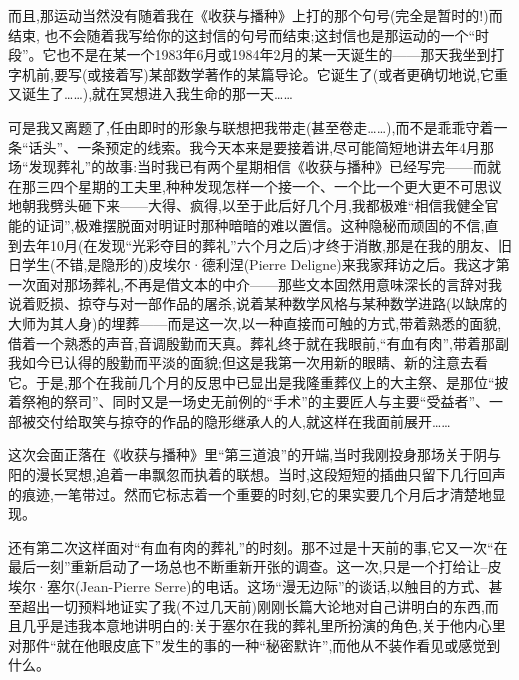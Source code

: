 而且,那运动当然没有随着我在《收获与播种》上打的那个句号(完全是暂时的!)而结束,
也不会随着我写给你的这封信的句号而结束;这封信也是那运动的一个“时段”。它也不是在某一个1983年6月或1984年2月的某一天诞生的——那天我坐到打字机前,要写(或接着写)某部数学著作的某篇导论。它诞生了(或者更确切地说,它重又诞生了……),就在冥想进入我生命的那一天……

可是我又离题了,任由即时的形象与联想把我带走(甚至卷走……),而不是乖乖守着一条“话头”、一条预定的线索。我今天本来是要接着讲,尽可能简短地讲去年4月那场“发现葬礼”的故事:当时我已有两个星期相信《收获与播种》已经写完——而就在那三四个星期的工夫里,种种发现怎样一个接一个、一个比一个更大更不可思议地朝我劈头砸下来——大得、疯得,以至于此后好几个月,我都极难“相信我健全官能的证词”,极难摆脱面对明证时那种暗暗的难以置信。这种隐秘而顽固的不信,直到去年10月(在发现“光彩夺目的葬礼”六个月之后)才终于消散,那是在我的朋友、旧日学生(不错,是隐形的)皮埃尔·德利涅(Pierre Deligne)来我家拜访之后。我这才第一次面对那场葬礼,不再是借文本的中介——那些文本固然用意味深长的言辞对我说着贬损、掠夺与对一部作品的屠杀,说着某种数学风格与某种数学进路(以缺席的大师为其人身)的埋葬——而是这一次,以一种直接而可触的方式,带着熟悉的面貌,借着一个熟悉的声音,音调殷勤而天真。葬礼终于就在我眼前,“有血有肉”,带着那副我如今已认得的殷勤而平淡的面貌;但这是我第一次用新的眼睛、新的注意去看它。于是,那个在我前几个月的反思中已显出是我隆重葬仪上的大主祭、是那位“披着祭袍的祭司”、同时又是一场史无前例的“手术”的主要匠人与主要“受益者”、一部被交付给取笑与掠夺的作品的隐形继承人的人,就这样在我面前展开……

这次会面正落在《收获与播种》里“第三道浪”的开端,当时我刚投身那场关于阴与阳的漫长冥想,追着一串飘忽而执着的联想。当时,这段短短的插曲只留下几行回声的痕迹,一笔带过。然而它标志着一个重要的时刻,它的果实要几个月后才清楚地显现。

还有第二次这样面对“有血有肉的葬礼”的时刻。那不过是十天前的事,它又一次“在最后一刻”重新启动了一场总也不断重新开张的调查。这一次,只是一个打给让–皮埃尔·塞尔(Jean-Pierre Serre)的电话。这场“漫无边际”的谈话,以触目的方式、甚至超出一切预料地证实了我(不过几天前)刚刚长篇大论地对自己讲明白的东西,而且几乎是违我本意地讲明白的:关于塞尔在我的葬礼里所扮演的角色,关于他内心里对那件“就在他眼皮底下”发生的事的一种“秘密默许”,而他从不装作看见或感觉到什么。

